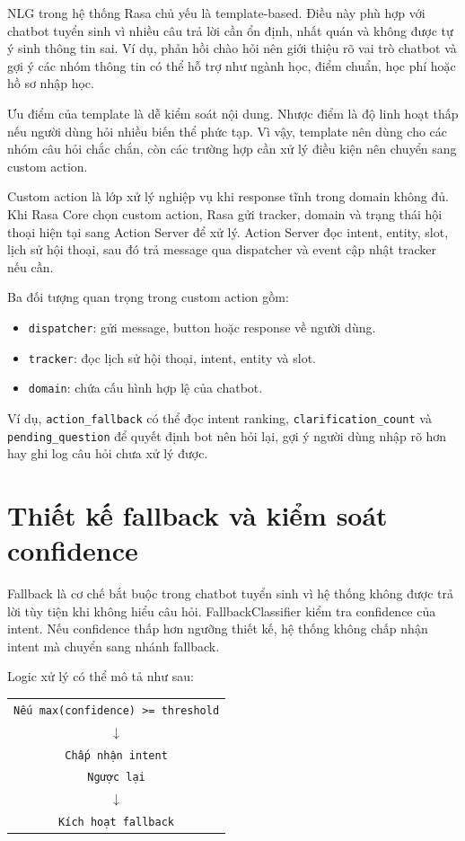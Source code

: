\documentclass[12pt,a4paper]{report}
\begin{document}
NLG trong hệ thống Rasa chủ yếu là template-based. Điều này phù hợp với chatbot tuyển sinh vì nhiều câu trả lời cần ổn định, nhất quán và không được tự ý sinh thông tin sai. Ví dụ, phản hồi chào hỏi nên giới thiệu rõ vai trò chatbot và gợi ý các nhóm thông tin có thể hỗ trợ như ngành học, điểm chuẩn, học phí hoặc hồ sơ nhập học.

Ưu điểm của template là dễ kiểm soát nội dung. Nhược điểm là độ linh hoạt thấp nếu người dùng hỏi nhiều biến thể phức tạp. Vì vậy, template nên dùng cho các nhóm câu hỏi chắc chắn, còn các trường hợp cần xử lý điều kiện nên chuyển sang custom action.

Custom action là lớp xử lý nghiệp vụ khi response tĩnh trong domain không đủ. Khi Rasa Core chọn custom action, Rasa gửi tracker, domain và trạng thái hội thoại hiện tại sang Action Server để xử lý. Action Server đọc intent, entity, slot, lịch sử hội thoại, sau đó trả message qua dispatcher và event cập nhật tracker nếu cần.

Ba đối tượng quan trọng trong custom action gồm:

\begin{itemize}
    \item \texttt{dispatcher}: gửi message, button hoặc response về người dùng.
    \item \texttt{tracker}: đọc lịch sử hội thoại, intent, entity và slot.
    \item \texttt{domain}: chứa cấu hình hợp lệ của chatbot.
\end{itemize}

Ví dụ, \texttt{action\_fallback} có thể đọc intent ranking, \texttt{clarification\_count} và \texttt{pending\_question} để quyết định bot nên hỏi lại, gợi ý người dùng nhập rõ hơn hay ghi log câu hỏi chưa xử lý được.


\section{Thiết kế fallback và kiểm soát confidence}

Fallback là cơ chế bắt buộc trong chatbot tuyển sinh vì hệ thống không được trả lời tùy tiện khi không hiểu câu hỏi. FallbackClassifier kiểm tra confidence của intent. Nếu confidence thấp hơn ngưỡng thiết kế, hệ thống không chấp nhận intent mà chuyển sang nhánh fallback.

Logic xử lý có thể mô tả như sau:

\begin{center}
\begin{tabular}{c}
\texttt{Nếu max(confidence) >= threshold} \\
$\downarrow$ \\
\texttt{Chấp nhận intent} \\
\texttt{Ngược lại} \\
$\downarrow$ \\
\texttt{Kích hoạt fallback}
\end{tabular}
\end{center}
\end{document}
